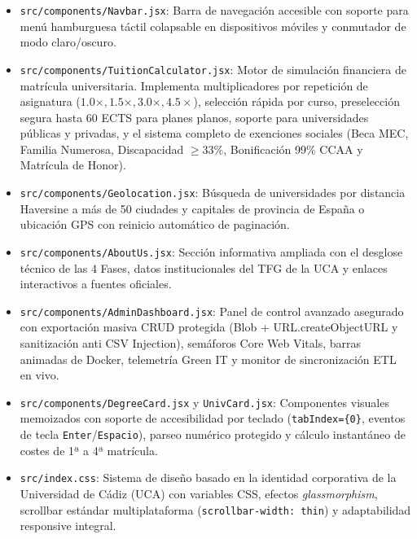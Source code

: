 \begin{itemize}
    \item \texttt{src/components/Navbar.jsx}: Barra de navegación accesible con soporte para menú hamburguesa táctil colapsable en dispositivos móviles y conmutador de modo claro/oscuro.
    \item \texttt{src/components/TuitionCalculator.jsx}: Motor de simulación financiera de matrícula universitaria. Implementa multiplicadores por repetición de asignatura ($1.0\times, 1.5\times, 3.0\times, 4.5\times$), selección rápida por curso, preselección segura hasta 60 ECTS para planes planos, soporte para universidades públicas y privadas, y el sistema completo de exenciones sociales (Beca MEC, Familia Numerosa, Discapacidad $\ge 33\%$, Bonificación 99\% CCAA y Matrícula de Honor).
    \item \texttt{src/components/Geolocation.jsx}: Búsqueda de universidades por distancia Haversine a más de 50 ciudades y capitales de provincia de España o ubicación GPS con reinicio automático de paginación.
    \item \texttt{src/components/AboutUs.jsx}: Sección informativa ampliada con el desglose técnico de las 4 Fases, datos institucionales del TFG de la UCA y enlaces interactivos a fuentes oficiales.
    \item \texttt{src/components/AdminDashboard.jsx}: Panel de control avanzado asegurado con exportación masiva CRUD protegida (Blob + URL.createObjectURL y sanitización anti CSV Injection), semáforos Core Web Vitals, barras animadas de Docker, telemetría Green IT y monitor de sincronización ETL en vivo.
    \item \texttt{src/components/DegreeCard.jsx} y \texttt{UnivCard.jsx}: Componentes visuales memoizados con soporte de accesibilidad por teclado (\texttt{tabIndex=\{0\}}, eventos de tecla \texttt{Enter}/\texttt{Espacio}), parseo numérico protegido y cálculo instantáneo de costes de 1ª a 4ª matrícula.
    \item \texttt{src/index.css}: Sistema de diseño basado en la identidad corporativa de la Universidad de Cádiz (UCA) con variables CSS, efectos \emph{glassmorphism}, scrollbar estándar multiplataforma (\texttt{scrollbar-width: thin}) y adaptabilidad responsive integral.
\end{itemize}

